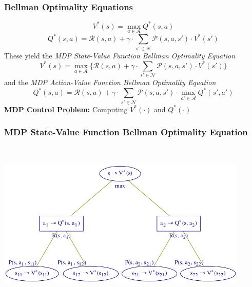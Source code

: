 \documentclass[handout]{beamer}
\begin{document}
\begin{frame}
\frametitle{Bellman Optimality Equations}
\pause
\begin{equation}
V^*(s) = \max_{a\in \mathcal{A}} Q^*(s,a)
\label{eq:mdp_bellman_opt_eqn_vq}
\end{equation}
\pause
\begin{equation}
Q^*(s,a) = \mathcal{R}(s,a) + \gamma \cdot \sum_{s' \in \mathcal{N}} \mathcal{P}(s,a,s') \cdot V^*(s')
 \label{eq:mdp_bellman_opt_eqn_qv}
\end{equation}
\pause
These yield the {\em MDP State-Value Function Bellman Optimality Equation}
\begin{equation}
V^*(s) = \max_{a\in \mathcal{A}} \{ \mathcal{R}(s,a) + \gamma \cdot \sum_{s' \in \mathcal{N}} \mathcal{P}(s,a,s') \cdot V^*(s') \}
\label{eq:mdp_bellman_opt_eqn_vv}
\end{equation}
\pause
and the {\em MDP Action-Value Function Bellman Optimality Equation}
\begin{equation}
Q^*(s,a) = \mathcal{R}(s,a) + \gamma \cdot \sum_{s' \in \mathcal{N}} \mathcal{P}(s,a,s') \cdot \max_{a'\in \mathcal{A}} Q^*(s',a')
\label{eq:mdp_bellman_opt_eqn_qq}
\end{equation}
\pause
{\bf MDP Control Problem:} Computing $V^*(\cdot)$ and $Q^*(\cdot)$
\end{frame}

\begin{frame}
\frametitle{MDP State-Value Function Bellman Optimality Equation}
\includegraphics[width=12cm, height=8cm]{mdp_bellman_opt_tree_vv.png}
\end{frame}
\end{document}

